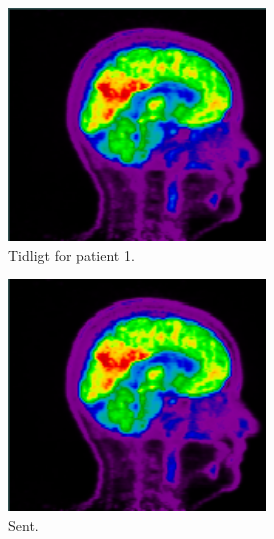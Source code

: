 \begin{figure}
    \centering
    \begin{subfigure}{0.3\textwidth}
        \centering
        \includegraphics[width=0.75\textwidth]{colager/over_tid_pet/over_tid_121280_early.png}
        \caption{Tidligt for patient 1.}
        \label{col:over_time_pet_pat1_early}
    \end{subfigure}\hfill
    \begin{subfigure}{0.3\textwidth}
        \centering
        \includegraphics[width=0.75\textwidth]{colager/over_tid_pet/over_tid_121280_late.png}
        \caption{Sent.}
        \label{col:over_time_pet_pat1_late}
    \end{subfigure}\hfill
    \begin{subfigure}{0.3\textwidth}
        \centering

\end{subfigure}
\end{figure}
